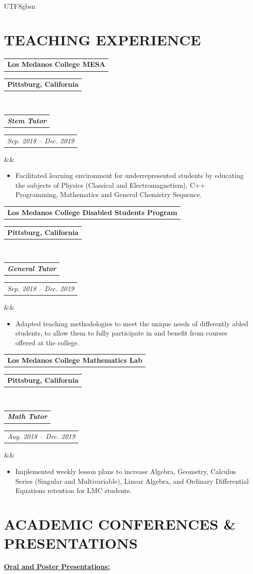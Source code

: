\documentclass[11pt,a4paper,palatine]{moderncv}        %
\makeatletter
\newcommand*{\customcventry}[7][.25em]{
  \begin{tabular}{@{}l} 
    {\bfseries #4}
  \end{tabular}
  \hfill%
  \begin{tabular}{l@{}}
     {\bfseries #5}
  \end{tabular} \\
  \begin{tabular}{@{}l} 
    {\itshape #3}
  \end{tabular}
  \hfill%
  \begin{tabular}{l@{}}
     {\itshape #2}
  \end{tabular}
  \ifx&#7&%
  \else{\\%
    \begin{minipage}{\maincolumnwidth}%
      \small#7%
    \end{minipage}}\fi%
  \par\addvspace{#1}}
\makeatother
\begin{document}
\begin{CJK*}{UTF8}{gbsn}
\newpage

\section{TEACHING EXPERIENCE}

\setlength{\parskip}{0.5em}

{\customcventry{ Sep. 2018 – Dec. 2019}{\textbf{Stem Tutor}}{Los Medanos College MESA}{Pittsburg, California}{}{}}
  {\begin{itemize}
    \item Facilitated learning environment for underrepresented students by educating the subjects of Physics (Classical and Electromagnetism), C++ Programming, Mathematics and General Chemistry Sequence.
  \end{itemize}
} 



\setlength{\parskip}{0.5em}

{\customcventry{  Sep. 2018 – Dec. 2019}{\textbf{General Tutor}}{Los Medanos College Disabled Students Program}{Pittsburg, California}{}{}}
  {\begin{itemize}
    \item Adapted teaching methodologies to meet the unique needs of differently abled students, to allow them to fully participate in and benefit from courses offered at the college.
  \end{itemize}
}

\setlength{\parskip}{0.5em}

{\customcventry{Aug. 2018 – Dec. 2019}{\textbf{Math Tutor}}{Los Medanos College Mathematics Lab}{Pittsburg, California}{}{}}
  {\begin{itemize}
    \item Implemented weekly lesson plans to increase Algebra, Geometry, Calculus Series (Singular and Multivariable), Linear Algebra, and Ordinary Differential Equations retention for LMC students.
  \end{itemize}
}


\section{ACADEMIC CONFERENCES \& PRESENTATIONS}

\underline{\textbf{Oral and Poster Presentations:}}

\quad


\end{CJK*}
\end{document}
